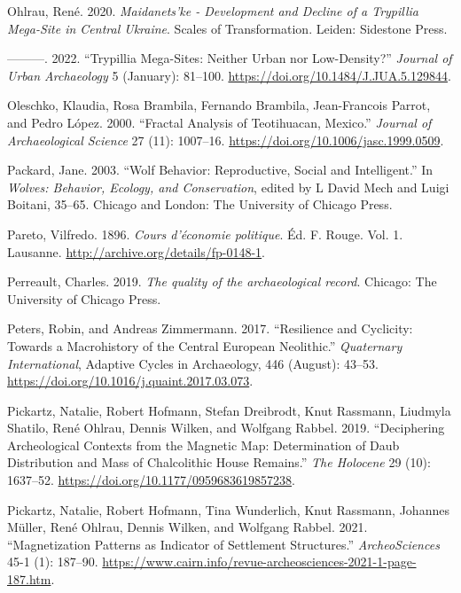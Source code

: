 \documentclass[
  12pt,
  a4paper, twoside]{book}
\newlength{\cslhangindent}
\newlength{\cslentryspacingunit} %
\newenvironment{CSLReferences}[2] %
 {%
  \setlength{\parindent}{0pt}
  \ifodd #1
  \let\oldpar\par
  \def\par{\hangindent=\cslhangindent\oldpar}
  \fi
  \setlength{\parskip}{#2\cslentryspacingunit}
 }%
 {}
\begin{document}
\begin{CSLReferences}{1}{0}
\leavevmode{}%
Ohlrau, René. 2020. \emph{Maidanets'ke - Development and Decline of a Trypillia Mega-Site in Central Ukraine}. Scales of Transformation. Leiden: Sidestone Press.

\leavevmode{}%
---------. 2022. {``Trypillia Mega-Sites: Neither Urban nor Low-Density?''} \emph{Journal of Urban Archaeology} 5 (January): 81--100. \url{https://doi.org/10.1484/J.JUA.5.129844}.

\leavevmode{}%
Oleschko, Klaudia, Rosa Brambila, Fernando Brambila, Jean-Francois Parrot, and Pedro López. 2000. {``Fractal Analysis of Teotihuacan, Mexico.''} \emph{Journal of Archaeological Science} 27 (11): 1007--16. \url{https://doi.org/10.1006/jasc.1999.0509}.

\leavevmode{}%
Packard, Jane. 2003. {``Wolf Behavior: Reproductive, Social and Intelligent.''} In \emph{Wolves: Behavior, Ecology, and Conservation}, edited by L David Mech and Luigi Boitani, 35--65. {Chicago and London}: {The University of Chicago Press}.

\leavevmode{}%
Pareto, Vilfredo. 1896. \emph{Cours d'économie politique}. Éd. F. Rouge. Vol. 1. Lausanne. \url{http://archive.org/details/fp-0148-1}.

\leavevmode{}%
Perreault, Charles. 2019. \emph{The quality of the archaeological record}. Chicago: The University of Chicago Press.

\leavevmode{}%
Peters, Robin, and Andreas Zimmermann. 2017. {``Resilience and Cyclicity: Towards a Macrohistory of the Central European Neolithic.''} \emph{Quaternary International}, Adaptive Cycles in Archaeology, 446 (August): 43--53. \url{https://doi.org/10.1016/j.quaint.2017.03.073}.

\leavevmode{}%
Pickartz, Natalie, Robert Hofmann, Stefan Dreibrodt, Knut Rassmann, Liudmyla Shatilo, René Ohlrau, Dennis Wilken, and Wolfgang Rabbel. 2019. {``Deciphering Archeological Contexts from the Magnetic Map: Determination of Daub Distribution and Mass of Chalcolithic House Remains.''} \emph{The Holocene} 29 (10): 1637--52. \url{https://doi.org/10.1177/0959683619857238}.

\leavevmode{}%
Pickartz, Natalie, Robert Hofmann, Tina Wunderlich, Knut Rassmann, Johannes Müller, René Ohlrau, Dennis Wilken, and Wolfgang Rabbel. 2021. {``Magnetization Patterns as Indicator of Settlement Structures.''} \emph{ArcheoSciences} 45-1 (1): 187--90. \url{https://www.cairn.info/revue-archeosciences-2021-1-page-187.htm}.


\end{CSLReferences}
\end{document}
